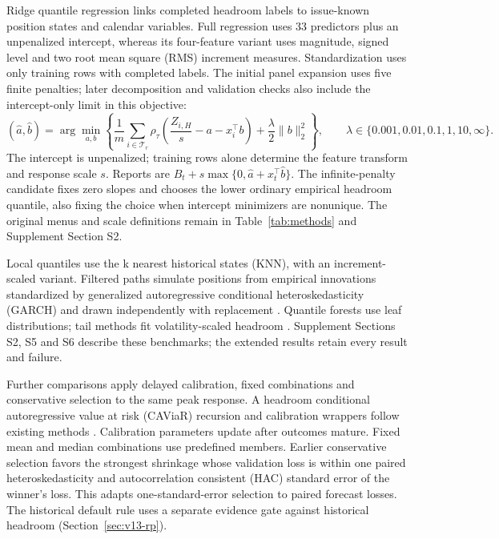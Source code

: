 \documentclass{rQUF2e}
\begin{document}
Ridge quantile regression links completed headroom labels to issue-known position states and calendar variables. Full regression uses 33 predictors plus an unpenalized intercept, whereas its four-feature variant uses magnitude, signed level and two root mean square (RMS) increment measures. Standardization uses only training rows with completed labels. The initial panel expansion uses five finite penalties; later decomposition and validation checks also include the intercept-only limit in this objective:
\[
(\hat a,\hat b)=\arg\min_{a,b}\left\{
\frac1m\sum_{i\in\mathcal T_r}\rho_\tau\!\left(\frac{Z_{i,H}}s-a-x_i^\top b\right)
+\frac\lambda2\|b\|_2^2\right\},\qquad
\lambda\in\{0.001,0.01,0.1,1,10,\infty\}.
\]
The intercept is unpenalized; training rows alone determine the feature transform and response scale \(s\).
Reports are \(B_t+s\max\{0,\hat a+x_t^\top\hat b\}\). The infinite-penalty candidate fixes zero slopes and chooses the lower ordinary empirical headroom quantile, also fixing the choice when intercept minimizers are nonunique.
The original menus and scale definitions remain in Table~\ref{tab:methods} and Supplement Section S2.

Local quantiles use the k nearest historical states (KNN), with an increment-scaled variant. Filtered paths simulate positions from empirical innovations standardized by generalized autoregressive conditional heteroskedasticity (GARCH) and drawn independently with replacement \citep{hull1998,barone1999}. Quantile forests use leaf distributions; tail methods fit volatility-scaled headroom \citep{mcneilfrey2000,meinshausen2006}. Supplement Sections S2, S5 and S6 describe these benchmarks; the extended results retain every result and failure.

Further comparisons apply delayed calibration, fixed combinations and conservative selection to the same peak response. A headroom conditional autoregressive value at risk (CAViaR) recursion and calibration wrappers follow existing methods \citep{engle2004,gibbs2021}. Calibration parameters update after outcomes mature. Fixed mean and median combinations use predefined members. Earlier conservative selection favors the strongest shrinkage whose validation loss is within one paired heteroskedasticity and autocorrelation consistent (HAC) standard error of the winner's loss. This adapts one-standard-error selection \citep{hastie2009} to paired forecast losses. The historical default rule uses a separate evidence gate against historical headroom (Section~\ref{sec:v13-rp}).
\end{document}
